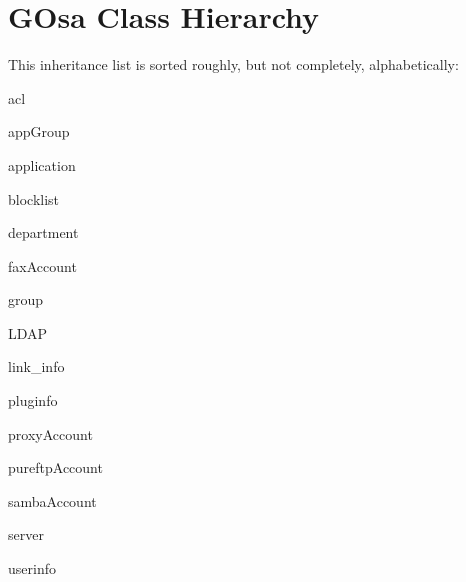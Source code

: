 \section{GOsa Class Hierarchy}
This inheritance list is sorted roughly, but not completely, alphabetically:\begin{CompactList}
\item acl\item app\-Group\item application\item blocklist\item department\item fax\-Account\item group\item LDAP\item link\_\-info\item {}
\begin{CompactList}
\item {}
\item {}
\item {}
\end{CompactList}
\item pluginfo\item proxy\-Account\item pureftp\-Account\item samba\-Account\item server\item userinfo\end{CompactList}
